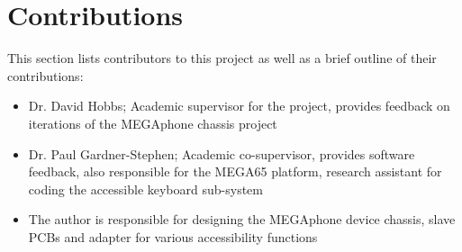 
\section{Contributions}

This section lists contributors to this project as well as a brief outline of their contributions:

\begin{itemize} 
    \item Dr. David Hobbs; Academic supervisor for the project, provides feedback on iterations of the MEGAphone chassis project
    \item Dr. Paul Gardner-Stephen; Academic co-supervisor, provides software feedback, also responsible for the MEGA65 platform, research assistant for coding the accessible keyboard sub-system %
    \item The author is responsible for designing the MEGAphone device chassis, slave PCBs and adapter for various accessibility functions
    \end{itemize}